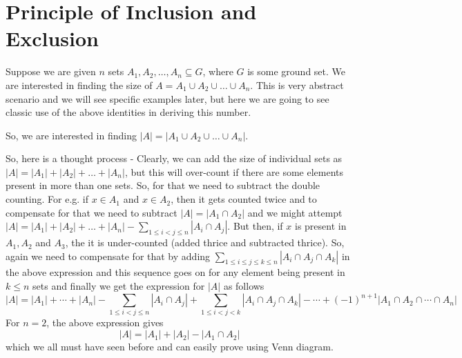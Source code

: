 \section{Principle of Inclusion and Exclusion}
Suppose we are given $n$ sets $A_1, A_2, \ldots, A_n\subseteq G$, where $G$ is some ground set. We are interested in finding the size of $A= A_1\cup A_2\cup\ldots\cup A_n$. This is very abstract scenario and we will see specific examples later, but here we are going to see classic use of the above identities in deriving this number.

So, we are interested in finding $|A| = |A_1\cup A_2\cup\ldots\cup A_n|$. 

So, here is a thought process - 
Clearly, we can add the size of individual sets as 
$|A| = |A_1|+|A_2|+\ldots +|A_n|$, but this will over-count if there are some elements present in more than one sets. So, for that we need to subtract the double counting. For e.g. if $x\in A_1$ and $x\in A_2$, then it gets counted twice and to compensate for that we need to subtract $|A|=|A_1\cap A_2|$ and we might attempt $|A| = |A_1|+|A_2|+\ldots +|A_n| - \sum_{1\le i < j\le n}|A_i\cap A_j|$. But then, if $x$ is present in $A_1, A_2$ and $A_3$, the it is under-counted (added thrice and subtracted thrice). So, again we need to compensate for that by adding $\sum_{1\le i \le j\le k\le n}|A_i\cap A_j\cap A_k|$ in the above expression and this sequence goes on for any element being present in $k\le n$ sets and finally we get the expression for $|A|$  as follows
\begin{equation} \label{eq:pie-1}
    |A| = |A_1|+\cdots+|A_n|-\sum_{1\le i< j\le n}|A_i\cap A_j| +\sum_{1\le i<j<k}|A_i\cap A_j\cap A_k| -\cdots + (-1)^{n+1}|A_1\cap A_2\cap\cdots\cap A_n|
\end{equation}
For $n=2$, the above expression gives
$$|A| = |A_1|+|A_2|-|A_1\cap A_2|$$
which we all must have seen before and can easily prove using Venn diagram. 

